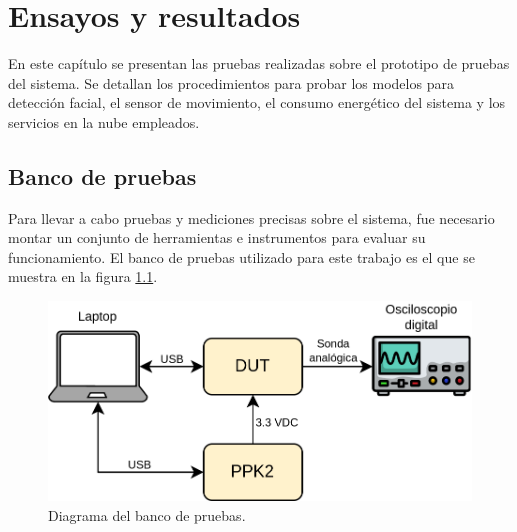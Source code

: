 
\chapter{Ensayos y resultados} %
En este capítulo se presentan las pruebas realizadas sobre el prototipo de pruebas del sistema. Se detallan los procedimientos para probar los modelos para detección facial, el sensor de movimiento, el consumo energético del sistema y los servicios en la nube empleados.

\label{Chapter4} %

\section{Banco de pruebas}
Para llevar a cabo pruebas y mediciones precisas sobre el sistema, fue necesario montar un conjunto de herramientas e instrumentos para evaluar su funcionamiento. El banco de pruebas utilizado para este trabajo es el que se muestra en la figura \ref{fig:test_bench}.

\begin{figure}[h]
	\centering
	\includegraphics[scale=0.3]{./Figures/test_bench.png}
	\caption{Diagrama del banco de pruebas.}
	\label{fig:test_bench}
\end{figure}

